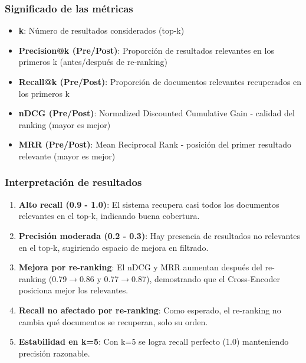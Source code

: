 \documentclass[12pt,a4paper]{article}
\begin{document}
\subsubsection{Significado de las métricas}

\begin{itemize}
    \item \textbf{k}: Número de resultados considerados (top-k)
    \item \textbf{Precision@k (Pre/Post)}: Proporción de resultados relevantes en los primeros k (antes/después de re-ranking)
    \item \textbf{Recall@k (Pre/Post)}: Proporción de documentos relevantes recuperados en los primeros k
    \item \textbf{nDCG (Pre/Post)}: Normalized Discounted Cumulative Gain - calidad del ranking (mayor es mejor)
    \item \textbf{MRR (Pre/Post)}: Mean Reciprocal Rank - posición del primer resultado relevante (mayor es mejor)
\end{itemize}

\subsubsection{Interpretación de resultados}

\begin{enumerate}
    \item \textbf{Alto recall (0.9 - 1.0)}: El sistema recupera casi todos los documentos relevantes en el top-k, indicando buena cobertura.
    
    \item \textbf{Precisión moderada (0.2 - 0.3)}: Hay presencia de resultados no relevantes en el top-k, sugiriendo espacio de mejora en filtrado.
    
    \item \textbf{Mejora por re-ranking}: El nDCG y MRR aumentan después del re-ranking (0.79$\rightarrow$0.86 y 0.77$\rightarrow$0.87), demostrando que el Cross-Encoder posiciona mejor los relevantes.
    
    \item \textbf{Recall no afectado por re-ranking}: Como esperado, el re-ranking no cambia qué documentos se recuperan, solo su orden.
    
    \item \textbf{Estabilidad en k=5}: Con k=5 se logra recall perfecto (1.0) manteniendo precisión razonable.
\end{enumerate}
\end{document}
